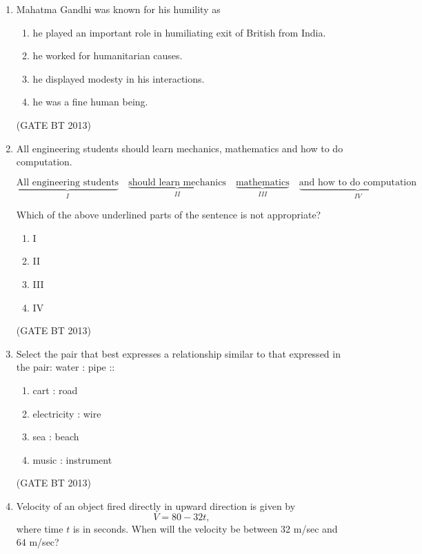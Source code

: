 \documentclass[journal,12pt,onecolumn]{IEEEtran}
\theoremstyle{remark}
\begin{document}
\begin{enumerate}
\item 

Mahatma Gandhi was known for his humility as

\begin{enumerate}[label=(\Alph*)]
    \item he played an important role in humiliating exit of British from India.
    \item he worked for humanitarian causes.
    \item he displayed modesty in his interactions.
    \item he was a fine human being.
\end{enumerate} \hfill(GATE BT 2013)

\item 

All engineering students should learn mechanics, mathematics and how to do computation.

\[
\underbrace{\text{All engineering students}}_{I} \quad
\underbrace{\text{should learn mechanics}}_{II} \quad
\underbrace{\text{mathematics}}_{III} \quad
\underbrace{\text{and how to do computation}}_{IV}
\]

Which of the above underlined parts of the sentence is not appropriate?

\begin{enumerate}[label=(\Alph*)]
    \item I
    \item II
    \item III
    \item IV
\end{enumerate} \hfill(GATE BT 2013)

\item 

Select the pair that best expresses a relationship similar to that expressed in the pair:  
water : pipe ::

\begin{enumerate}[label=(\Alph*)]
    \item cart : road
    \item electricity : wire
    \item sea : beach
    \item music : instrument
\end{enumerate} \hfill(GATE BT 2013)

\item 

Velocity of an object fired directly in upward direction is given by
\[
V = 80 - 32t,
\]
where time \(t\) is in seconds. When will the velocity be between 32 m/sec and 64 m/sec?


\end{enumerate}
\end{document}
